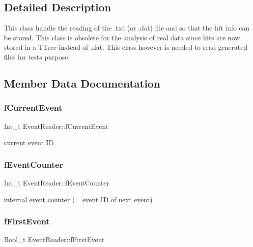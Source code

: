 \subsection{Detailed Description}
This class handle the reading of the .txt (or .dat) file and so that the hit info can be stored. This class is obsolete for the analysis of real data since hits are now stored in a T\+Tree instead of .dat. This class however is needed to read generated files for tests purpose. 

\subsection{Member Data Documentation}
\mbox{\label{class_event_reader_ac738aecc11ef01f0ced6d9de39701848}} 
\subsubsection{\texorpdfstring{f\+Current\+Event}{fCurrentEvent}}
{\footnotesize\ttfamily Int\+\_\+t Event\+Reader\+::f\+Current\+Event\hspace{0.3cm}{\ttfamily [private]}}

current event ID \mbox{\label{class_event_reader_a47a3228d169ec69259a5abb857ee0d0d}} 
\subsubsection{\texorpdfstring{f\+Event\+Counter}{fEventCounter}}
{\footnotesize\ttfamily Int\+\_\+t Event\+Reader\+::f\+Event\+Counter\hspace{0.3cm}{\ttfamily [private]}}

internal event counter (= event ID of next event) \mbox{\label{class_event_reader_ae44339b541ef8d3e88cf5b3bb6d3e4a2}} 
\subsubsection{\texorpdfstring{f\+First\+Event}{fFirstEvent}}
{\footnotesize\ttfamily Bool\+\_\+t Event\+Reader\+::f\+First\+Event\hspace{0.3cm}{\ttfamily [private]}}

